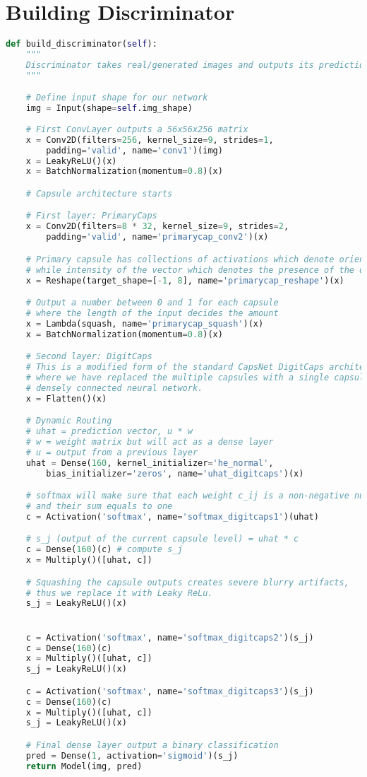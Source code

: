 \section{Building Discriminator} %
\label{sec:building_discriminator}
\begin{lstlisting}[basicstyle=\scriptsize,language=Python]
def build_discriminator(self):
    """
    Discriminator takes real/generated images and outputs its prediction.
    """

    # Define input shape for our network
    img = Input(shape=self.img_shape)
    
    # First ConvLayer outputs a 56x56x256 matrix
    x = Conv2D(filters=256, kernel_size=9, strides=1, 
        padding='valid', name='conv1')(img)
    x = LeakyReLU()(x)
    x = BatchNormalization(momentum=0.8)(x)

    # Capsule architecture starts

    # First layer: PrimaryCaps
    x = Conv2D(filters=8 * 32, kernel_size=9, strides=2, 
        padding='valid', name='primarycap_conv2')(x)

    # Primary capsule has collections of activations which denote orientation
    # while intensity of the vector which denotes the presence of the digit)
    x = Reshape(target_shape=[-1, 8], name='primarycap_reshape')(x)

    # Output a number between 0 and 1 for each capsule 
    # where the length of the input decides the amount
    x = Lambda(squash, name='primarycap_squash')(x)
    x = BatchNormalization(momentum=0.8)(x)

    # Second layer: DigitCaps
    # This is a modified form of the standard CapsNet DigitCaps architecture 
    # where we have replaced the multiple capsules with a single capsule of 
    # densely connected neural network.
    x = Flatten()(x)

    # Dynamic Routing
    # uhat = prediction vector, u * w
    # w = weight matrix but will act as a dense layer
    # u = output from a previous layer
    uhat = Dense(160, kernel_initializer='he_normal', 
        bias_initializer='zeros', name='uhat_digitcaps')(x)

    # softmax will make sure that each weight c_ij is a non-negative number 
    # and their sum equals to one
    c = Activation('softmax', name='softmax_digitcaps1')(uhat) 

    # s_j (output of the current capsule level) = uhat * c
    c = Dense(160)(c) # compute s_j
    x = Multiply()([uhat, c])

    # Squashing the capsule outputs creates severe blurry artifacts, 
    # thus we replace it with Leaky ReLu.
    s_j = LeakyReLU()(x)


    c = Activation('softmax', name='softmax_digitcaps2')(s_j) 
    c = Dense(160)(c)
    x = Multiply()([uhat, c])
    s_j = LeakyReLU()(x)

    c = Activation('softmax', name='softmax_digitcaps3')(s_j) 
    c = Dense(160)(c)
    x = Multiply()([uhat, c])
    s_j = LeakyReLU()(x)

    # Final dense layer output a binary classification
    pred = Dense(1, activation='sigmoid')(s_j)
    return Model(img, pred)
\end{lstlisting}

